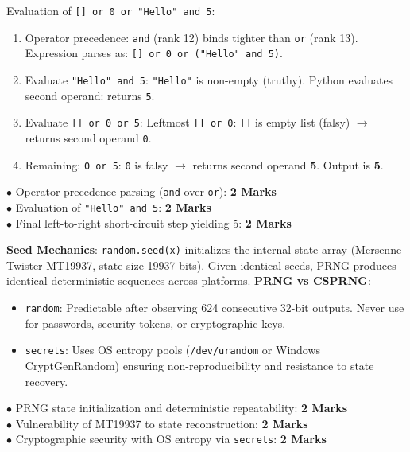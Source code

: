 \begin{solutionbox}
Evaluation of \texttt{[] or 0 or "Hello" and 5}:
\begin{enumerate}[leftmargin=1.5em]
    \item Operator precedence: \texttt{and} (rank 12) binds tighter than \texttt{or} (rank 13). Expression parses as: \texttt{[] or 0 or ("Hello" and 5)}.
    \item Evaluate \texttt{"Hello" and 5}: \texttt{"Hello"} is non-empty (truthy). Python evaluates second operand: returns \texttt{5}.
    \item Evaluate \texttt{[] or 0 or 5}: Leftmost \texttt{[] or 0}: \texttt{[]} is empty list (falsy) $\to$ returns second operand \texttt{0}.
    \item Remaining: \texttt{0 or 5}: \texttt{0} is falsy $\to$ returns second operand \textbf{5}. Output is \textbf{5}.
\end{enumerate}
\begin{markingrubric}
$\bullet$ Operator precedence parsing (\texttt{and} over \texttt{or}): \textbf{2 Marks}\\
$\bullet$ Evaluation of \texttt{"Hello" and 5}: \textbf{2 Marks}\\
$\bullet$ Final left-to-right short-circuit step yielding 5: \textbf{2 Marks}
\end{markingrubric}
\end{solutionbox}

\begin{solutionbox}
\textbf{Seed Mechanics}: \texttt{random.seed(x)} initializes the internal state array (Mersenne Twister MT19937, state size 19937 bits). Given identical seeds, PRNG produces identical deterministic sequences across platforms.
\textbf{PRNG vs CSPRNG}:
\begin{itemize}[leftmargin=1.5em]
    \item \texttt{random}: Predictable after observing 624 consecutive 32-bit outputs. Never use for passwords, security tokens, or cryptographic keys.
    \item \texttt{secrets}: Uses OS entropy pools (\texttt{/dev/urandom} or Windows CryptGenRandom) ensuring non-reproducibility and resistance to state recovery.
\end{itemize}
\begin{markingrubric}
$\bullet$ PRNG state initialization and deterministic repeatability: \textbf{2 Marks}\\
$\bullet$ Vulnerability of MT19937 to state reconstruction: \textbf{2 Marks}\\
$\bullet$ Cryptographic security with OS entropy via \texttt{secrets}: \textbf{2 Marks}
\end{markingrubric}
\end{solutionbox}

